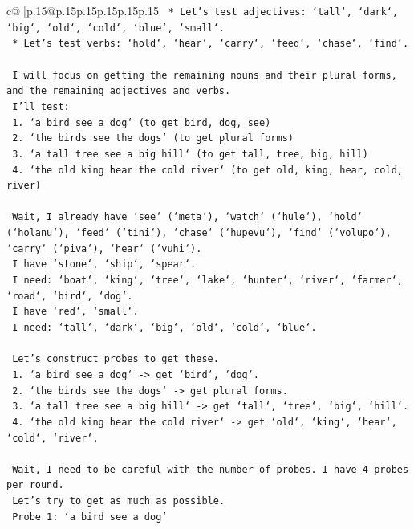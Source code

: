 \documentclass{article}
\begin{document}
{\begin{supertabular}{c@{$\;$}|p{.15\linewidth}@{}p{.15\linewidth}p{.15\linewidth}p{.15\linewidth}p{.15\linewidth}p{.15\linewidth}}
{{{\texttt{    *   Let's test adjectives: `tall`, `dark`, `big`, `old`, `cold`, `blue`, `small`.} \\
\texttt{    *   Let's test verbs: `hold`, `hear`, `carry`, `feed`, `chase`, `find`.} \\
\\ 
\texttt{    I will focus on getting the remaining nouns and their plural forms, and the remaining adjectives and verbs.} \\
\texttt{    I'll test:} \\
\texttt{    1.  `a bird see a dog` (to get bird, dog, see)} \\
\texttt{    2.  `the birds see the dogs` (to get plural forms)} \\
\texttt{    3.  `a tall tree see a big hill` (to get tall, tree, big, hill)} \\
\texttt{    4.  `the old king hear the cold river` (to get old, king, hear, cold, river)} \\
\\ 
\texttt{    Wait, I already have `see` (`meta`), `watch` (`hule`), `hold` (`holanu`), `feed` (`tini`), `chase` (`hupevu`), `find` (`volupo`), `carry` (`piva`), `hear` (`vuhi`).} \\
\texttt{    I have `stone`, `ship`, `spear`.} \\
\texttt{    I need: `boat`, `king`, `tree`, `lake`, `hunter`, `river`, `farmer`, `road`, `bird`, `dog`.} \\
\texttt{    I have `red`, `small`.} \\
\texttt{    I need: `tall`, `dark`, `big`, `old`, `cold`, `blue`.} \\
\\ 
\texttt{    Let's construct probes to get these.} \\
\texttt{    1. `a bird see a dog` {-}> get `bird`, `dog`.} \\
\texttt{    2. `the birds see the dogs` {-}> get plural forms.} \\
\texttt{    3. `a tall tree see a big hill` {-}> get `tall`, `tree`, `big`, `hill`.} \\
\texttt{    4. `the old king hear the cold river` {-}> get `old`, `king`, `hear`, `cold`, `river`.} \\
\\ 
\texttt{    Wait, I need to be careful with the number of probes. I have 4 probes per round.} \\
\texttt{    Let's try to get as much as possible.} \\
\texttt{    Probe 1: `a bird see a dog`} \\
}}}
\end{supertabular}}
\end{document}
